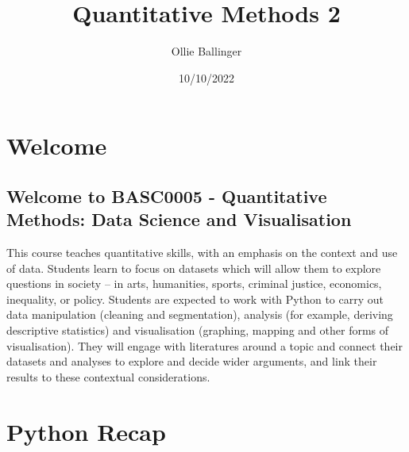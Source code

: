 \documentclass[
  letterpaper,
  DIV=11,
  numbers=noendperiod]{scrreprt}
\title{Quantitative Methods 2}
\author{Ollie Ballinger}
\date{10/10/2022}
\renewcommand*\contentsname{Table of contents}
\newcommand\contentsname{Table of contents}
\begin{document}
\maketitle
\ifdefined\Shaded\renewenvironment{Shaded}{\begin{tcolorbox}[frame hidden, borderline west={3pt}{0pt}{shadecolor}, breakable, enhanced, boxrule=0pt, interior hidden, sharp corners]}{\end{tcolorbox}}\fi

\renewcommand*\contentsname{Table of contents}
{
\hypersetup{linkcolor=}
\setcounter{tocdepth}{2}
\tableofcontents
}

\hypertarget{welcome}{%
\chapter*{Welcome}\label{welcome}}

\hypertarget{welcome-to-basc0005---quantitative-methods-data-science-and-visualisation}{%
\section*{Welcome to BASC0005 - Quantitative Methods: Data Science and
Visualisation}\label{welcome-to-basc0005---quantitative-methods-data-science-and-visualisation}}

This course teaches quantitative skills, with an emphasis on the context
and use of data. Students learn to focus on datasets which will allow
them to explore questions in society -- in arts, humanities, sports,
criminal justice, economics, inequality, or policy. Students are
expected to work with Python to carry out data manipulation (cleaning
and segmentation), analysis (for example, deriving descriptive
statistics) and visualisation (graphing, mapping and other forms of
visualisation). They will engage with literatures around a topic and
connect their datasets and analyses to explore and decide wider
arguments, and link their results to these contextual considerations.


\hypertarget{python-recap}{%
\chapter{Python Recap}\label{python-recap}}
\end{document}
